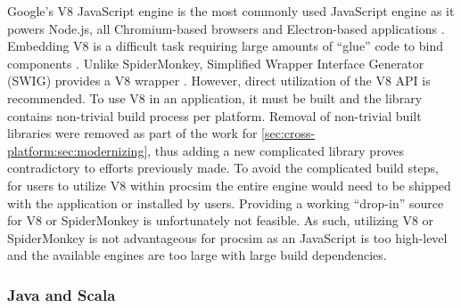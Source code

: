 Google's V8 JavaScript engine is the most commonly used JavaScript engine as it powers Node.js, all Chromium-based browsers and Electron-based applications \cite{Google:V8}. Embedding V8 is a difficult task requiring large amounts of ``glue'' code to bind components \cite{Google:V8:Embedding}. Unlike SpiderMonkey, Simplified Wrapper Interface Generator (SWIG) provides a V8 wrapper \cite{SWIG:Homepage}. However, direct utilization of the V8 API is recommended. To use V8 in an application, it must be built and the library contains non-trivial build process per platform. Removal of non-trivial built libraries were removed as part of the work for \cref{sec:cross-platform:sec:modernizing}, thus adding a new complicated library proves contradictory to efforts previously made. To avoid the complicated build steps, for users to utilize V8 within procsim the entire engine would need to be shipped with the application or installed by users. Providing a working ``drop-in'' source for V8 or SpiderMonkey is unfortunately not feasible. As such, utilizing V8 or SpiderMonkey is not advantageous for procsim as an JavaScript is too high-level and the available engines are too large with large build dependencies.

\subsubsection{Java and Scala}

